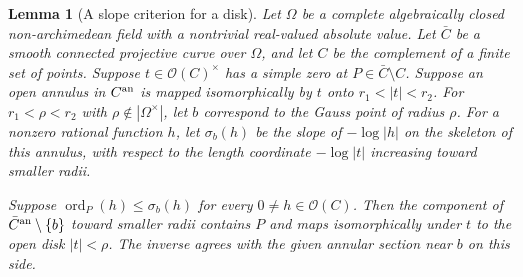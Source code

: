 \documentclass[11pt,reqno]{amsart}
\numberwithin{equation}{section}
\newtheorem{lemma}[theorem]{Lemma}
\theoremstyle{definition}
\theoremstyle{remark}
\DeclareMathOperator{\ord}{ord}
\begin{document}
\begin{lemma}[A slope criterion for a disk]\label{lem:annular-slope-disk}
Let \(\Omega\) be a complete algebraically closed non-archimedean
field with a nontrivial real-valued absolute value. Let \(\bar C\) be a smooth connected projective curve over
\(\Omega\), and let \(C\) be the complement of a finite set of points.
Suppose \(t\in\mathcal O(C)^\times\) has a simple zero at
\(P\in\bar C\setminus C\). Suppose an open annulus in \(C^{\rm an}\)
is mapped isomorphically by \(t\) onto \(r_1<|t|<r_2\). For
\(r_1<\rho<r_2\) with \(\rho\notin|\Omega^\times|\), let \(b\)
correspond to the Gauss point of radius \(\rho\). For a nonzero rational
function \(h\), let \(\sigma_b(h)\) be the slope of \(-\log|h|\) on
the skeleton of this annulus, with respect to the length coordinate
\(-\log|t|\) increasing toward smaller radii.

Suppose \(\ord_P(h)\le\sigma_b(h)\) for every
\(0\ne h\in\mathcal O(C)\). Then the component of
\(\bar C^{\rm an}\setminus\{b\}\) toward smaller radii contains \(P\)
and maps isomorphically under \(t\) to the open disk \(|t|<\rho\).
The inverse agrees with the given annular section near \(b\) on this side.
\end{lemma}
\end{document}
